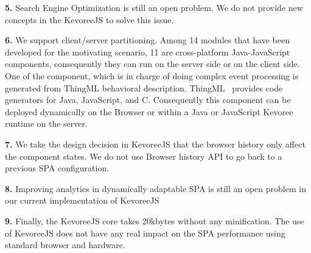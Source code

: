 \indent \textbf{5.} Search Engine Optimization is still an open problem. We do not provide new concepts in the KevoreeJS to solve this issue.

\indent \textbf{6.} We support client/server partitioning. Among 14 modules that have been developed for the motivating scenario, 11 are cross-platform Java-JavaScript components, consequently they can run on the server side or on the client side.  One of the component, which is in charge of doing complex event processing is generated from ThingML behavioral description. ThingML~\cite{DBLP:conf/models/FleureyMSB11} provides code generators for Java, JavaScript, and C. Consequently this component can be deployed dynamically on the Browser or within a Java or JavaScript Kevoree runtime on the server.

\indent \textbf{7.} We take the design decision in KevoreeJS that the browser history only affect the component states. We do not use Browser history API to go back to a previous SPA configuration.

\indent \textbf{8.} Improving analytics in dynamically adaptable SPA is still an open problem in our current implementation of KevoreeJS

\indent \textbf{9.} Finally, the KevoreeJS core takes 20kbytes without any minification. The use of KevoreeJS does not have any real impact on the SPA performance using standard browser and hardware.
